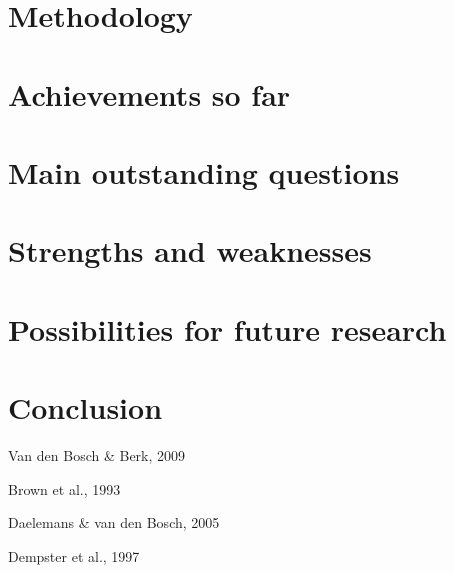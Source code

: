 \documentclass[12pt]{article}
\begin{document}
\section{Methodology}


\section{Achievements so far}
\section{Main outstanding questions}
\section{Strengths and weaknesses}
\section{Possibilities for future research}
\section{Conclusion}

\begin{thebibliography}{99}

Van den Bosch \& Berk, 2009

Brown et al., 1993

Daelemans \& van den Bosch, 2005

Dempster et al., 1997

\end{thebibliography}
\end{document}

